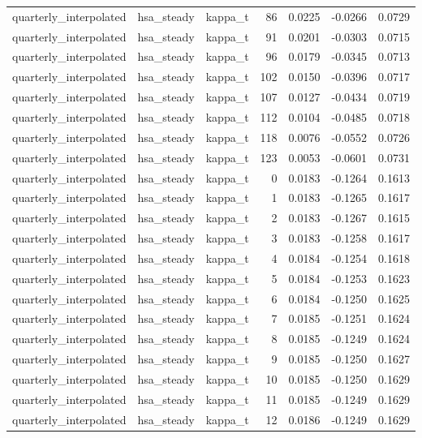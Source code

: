 \begin{tabular}{lllrrrr}
quarterly\_interpolated & hsa\_steady & kappa\_t & 86 & 0.0225 & -0.0266 & 0.0729 \\
quarterly\_interpolated & hsa\_steady & kappa\_t & 91 & 0.0201 & -0.0303 & 0.0715 \\
quarterly\_interpolated & hsa\_steady & kappa\_t & 96 & 0.0179 & -0.0345 & 0.0713 \\
quarterly\_interpolated & hsa\_steady & kappa\_t & 102 & 0.0150 & -0.0396 & 0.0717 \\
quarterly\_interpolated & hsa\_steady & kappa\_t & 107 & 0.0127 & -0.0434 & 0.0719 \\
quarterly\_interpolated & hsa\_steady & kappa\_t & 112 & 0.0104 & -0.0485 & 0.0718 \\
quarterly\_interpolated & hsa\_steady & kappa\_t & 118 & 0.0076 & -0.0552 & 0.0726 \\
quarterly\_interpolated & hsa\_steady & kappa\_t & 123 & 0.0053 & -0.0601 & 0.0731 \\
quarterly\_interpolated & hsa\_steady & kappa\_t & 0 & 0.0183 & -0.1264 & 0.1613 \\
quarterly\_interpolated & hsa\_steady & kappa\_t & 1 & 0.0183 & -0.1265 & 0.1617 \\
quarterly\_interpolated & hsa\_steady & kappa\_t & 2 & 0.0183 & -0.1267 & 0.1615 \\
quarterly\_interpolated & hsa\_steady & kappa\_t & 3 & 0.0183 & -0.1258 & 0.1617 \\
quarterly\_interpolated & hsa\_steady & kappa\_t & 4 & 0.0184 & -0.1254 & 0.1618 \\
quarterly\_interpolated & hsa\_steady & kappa\_t & 5 & 0.0184 & -0.1253 & 0.1623 \\
quarterly\_interpolated & hsa\_steady & kappa\_t & 6 & 0.0184 & -0.1250 & 0.1625 \\
quarterly\_interpolated & hsa\_steady & kappa\_t & 7 & 0.0185 & -0.1251 & 0.1624 \\
quarterly\_interpolated & hsa\_steady & kappa\_t & 8 & 0.0185 & -0.1249 & 0.1624 \\
quarterly\_interpolated & hsa\_steady & kappa\_t & 9 & 0.0185 & -0.1250 & 0.1627 \\
quarterly\_interpolated & hsa\_steady & kappa\_t & 10 & 0.0185 & -0.1250 & 0.1629 \\
quarterly\_interpolated & hsa\_steady & kappa\_t & 11 & 0.0185 & -0.1249 & 0.1629 \\
quarterly\_interpolated & hsa\_steady & kappa\_t & 12 & 0.0186 & -0.1249 & 0.1629 \\

\end{tabular}
